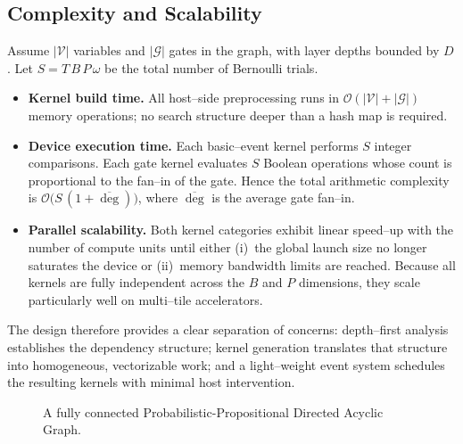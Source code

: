 \subsection{Complexity and Scalability}
\label{subsec:complexity}

Assume $|\mathcal{V}|$ variables and $|\mathcal{G}|$ gates in the graph, with
layer depths bounded by $D$.  Let $S=T\,B\,P\,\omega$ be the total number of
Bernoulli trials.
\begin{itemize}
  \item \textbf{Kernel build time.}  All host--side preprocessing runs in
        $\mathcal{O}(|\mathcal{V}|+|\mathcal{G}|)$ memory operations; no search
        structure deeper than a hash map is required.
  \item \textbf{Device execution time.}  Each basic--event kernel performs
        $S$ integer comparisons.  Each gate kernel evaluates $S$ Boolean
        operations whose count is proportional to the fan--in of the gate.
        Hence the total arithmetic complexity is
        $\mathcal{O}\bigl(S\,(1+\overline{\deg})\bigr)$, where
        $\overline{\deg}$ is the average gate fan--in.
  \item \textbf{Parallel scalability.}  Both kernel categories exhibit linear
        speed--up with the number of compute units until either (i)~the global
        launch size no longer saturates the device or (ii)~memory bandwidth
        limits are reached.  Because all kernels are fully independent across
        the $B$ and $P$ dimensions, they scale particularly well on
        multi--tile accelerators.
\end{itemize}

The design therefore provides a clear separation of concerns: depth--first
analysis establishes the dependency structure; kernel generation translates
that structure into homogeneous, vectorizable work; and a light--weight event
system schedules the resulting kernels with minimal host intervention.


\begin{landscape}
\begin{figure}[p]
    \centering
    
    \caption{A fully connected Probabilistic-Propositional Directed Acyclic Graph.}
    \label{fig:feedforward_ppdag}
\end{figure}
\end{landscape}


